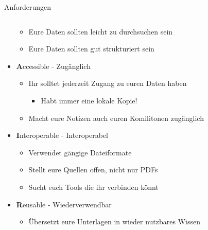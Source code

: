 \begin{frame}{Anforderungen}
\begin{columns}[t]
\begin{column}[t]{0.84\textwidth}
\begin{itemize}
                \begin{itemize}
                    \item Eure Daten sollten leicht zu durchsuchen sein
                    \item Eure Daten sollten gut strukturiert sein
                \end{itemize}
                \item[] \textbf{A}ccessible - Zugänglich
                \begin{itemize}
                    \item Ihr solltet jederzeit Zugang zu euren Daten haben
                    \begin{itemize}
                        \item Habt immer eine lokale Kopie!
                    \end{itemize}
                \item Macht eure Notizen auch euren Komilitonen zugänglich
            \end{itemize}
                \item[] \textbf{I}nteroperable - Interoperabel
                \begin{itemize}
                    \item Verwendet gängige Dateiformate
                    \item Stellt eure Quellen offen, nicht nur PDFs
                    \item Sucht euch Tools die ihr verbinden könnt
                \end{itemize}
                \item[] \textbf{R}eusable - Wiederverwendbar
                \begin{itemize}
                    \item Übersetzt eure Unterlagen in wieder nutzbares Wissen
                \end{itemize}
            \end{itemize}
        \end{column}
    \end{columns}  
\end{frame}

